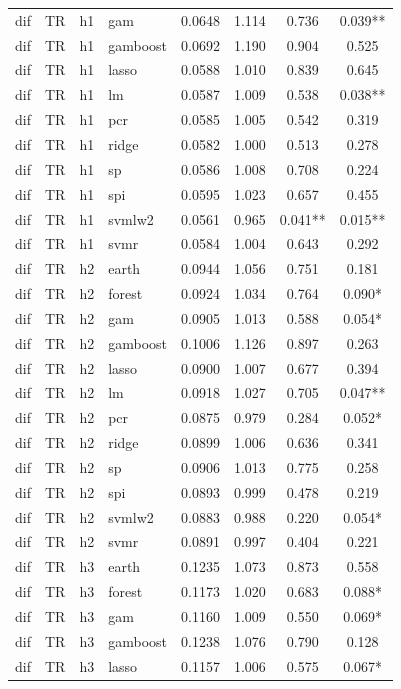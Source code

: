 \begin{ThreePartTable}
\begin{longtable}[t]{llclcccc}
dif & TR & h1 & gam & 0.0648 & 1.114 & 0.736 & 0.039**\\
dif & TR & h1 & gamboost & 0.0692 & 1.190 & 0.904 & 0.525\\
dif & TR & h1 & lasso & 0.0588 & 1.010 & 0.839 & 0.645\\
dif & TR & h1 & lm & 0.0587 & 1.009 & 0.538 & 0.038**\\
dif & TR & h1 & pcr & 0.0585 & 1.005 & 0.542 & 0.319\\
dif & TR & h1 & ridge & 0.0582 & 1.000 & 0.513 & 0.278\\
dif & TR & h1 & sp & 0.0586 & 1.008 & 0.708 & 0.224\\
dif & TR & h1 & spi & 0.0595 & 1.023 & 0.657 & 0.455\\
dif & TR & h1 & svmlw2 & 0.0561 & 0.965 & 0.041** & 0.015**\\
dif & TR & h1 & svmr & 0.0584 & 1.004 & 0.643 & 0.292\\
\addlinespace
dif & TR & h2 & earth & 0.0944 & 1.056 & 0.751 & 0.181\\
dif & TR & h2 & forest & 0.0924 & 1.034 & 0.764 & 0.090*\\
dif & TR & h2 & gam & 0.0905 & 1.013 & 0.588 & 0.054*\\
dif & TR & h2 & gamboost & 0.1006 & 1.126 & 0.897 & 0.263\\
dif & TR & h2 & lasso & 0.0900 & 1.007 & 0.677 & 0.394\\
dif & TR & h2 & lm & 0.0918 & 1.027 & 0.705 & 0.047**\\
dif & TR & h2 & pcr & 0.0875 & 0.979 & 0.284 & 0.052*\\
dif & TR & h2 & ridge & 0.0899 & 1.006 & 0.636 & 0.341\\
dif & TR & h2 & sp & 0.0906 & 1.013 & 0.775 & 0.258\\
dif & TR & h2 & spi & 0.0893 & 0.999 & 0.478 & 0.219\\
dif & TR & h2 & svmlw2 & 0.0883 & 0.988 & 0.220 & 0.054*\\
dif & TR & h2 & svmr & 0.0891 & 0.997 & 0.404 & 0.221\\
\addlinespace
dif & TR & h3 & earth & 0.1235 & 1.073 & 0.873 & 0.558\\
dif & TR & h3 & forest & 0.1173 & 1.020 & 0.683 & 0.088*\\
dif & TR & h3 & gam & 0.1160 & 1.009 & 0.550 & 0.069*\\
dif & TR & h3 & gamboost & 0.1238 & 1.076 & 0.790 & 0.128\\
dif & TR & h3 & lasso & 0.1157 & 1.006 & 0.575 & 0.067*\\

\end{longtable}
\end{ThreePartTable}
